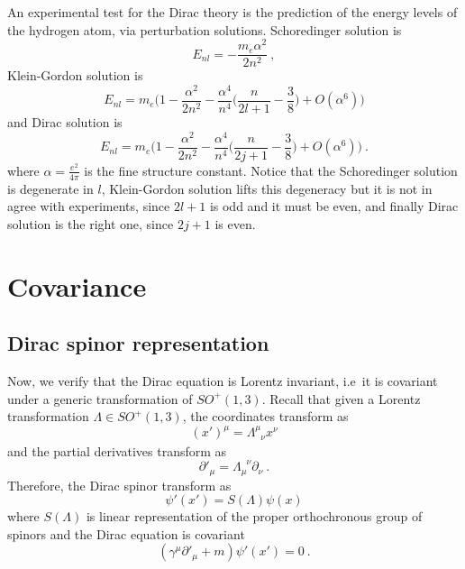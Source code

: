     An experimental test for the Dirac theory is the prediction of the energy levels of the hydrogen atom, via perturbation solutions. Schoredinger solution is 
    \begin{equation*}
        E_{nl} = - \frac{m_e \alpha^2}{2 n^2} ~,
    \end{equation*}
    Klein-Gordon solution is 
    \begin{equation*}
        E_{nl} = m_e \Big( 1 - \frac{\alpha^2}{2n^2} - \frac{\alpha^4}{n^4} \Big ( \frac{n}{2l+1} - \frac{3}{8} \Big) + O(\alpha^6)\Big)
    \end{equation*}
    and Dirac solution is
    \begin{equation*}
        E_{nl} = m_e \Big( 1 - \frac{\alpha^2}{2n^2} - \frac{\alpha^4}{n^4} \Big ( \frac{n}{2j+1} - \frac{3}{8} \Big) + O(\alpha^6)\Big) ~.
    \end{equation*}
    where $\alpha = \frac{e^2}{4\pi}$ is the fine structure constant. Notice that the Schoredinger solution is degenerate in $l$, Klein-Gordon solution lifts this degeneracy but it is not in agree with experiments, since $2l+1$ is odd and it must be even, and finally Dirac solution is the right one, since $2j+1$ is even.

\chapter{Covariance} 

\section{Dirac spinor representation}

    Now, we verify that the Dirac equation is Lorentz invariant, i.e~it is covariant under a generic transformation of $SO^+(1,3)$. Recall that given a Lorentz transformation $\Lambda \in SO^+(1,3)$, the coordinates transform as 
    \begin{equation*}
        (x')^\mu = \Lambda^\mu_{\phantom \mu \nu} x^\nu
    \end{equation*}
    and the partial derivatives transform as 
    \begin{equation*}
        {\partial'}_\mu = \Lambda_\mu^{\phantom \mu \nu} \partial_\nu ~.
    \end{equation*}
    Therefore, the Dirac spinor transform as 
    \begin{equation*}
        \psi'(x') = S(\Lambda) \psi(x)
    \end{equation*}
    where $S(\Lambda)$ is linear representation of the proper orthochronous group of spinors and the Dirac equation is covariant 
    \begin{equation*}
        (\gamma^\mu \partial'_\mu + m) \psi' (x') = 0 ~.
    \end{equation*}

